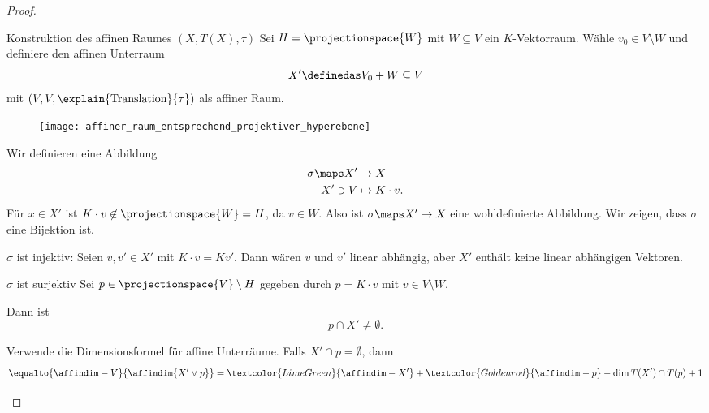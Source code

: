 \begin{proof}
  \begin{proofdescription}
    \item[Konstruktion des affinen Raumes \( (X,T(X),\tau) \)] Sei \( H=\projectionspace{W} \) mit \( W\subseteq V \) ein \( K \)-Vektorraum. Wähle \( v_0\in V\setminus W \) und definiere den affinen Unterraum
    \begin{equation*}
      X'\definedas V_0+W\subseteq V
    \end{equation*}
    mit \( (V,V,\explain{\text{Translation}}{\tau}) \) als affiner Raum.
    \begin{figure}[H]
      \centering
      \texttt{[image: affiner\_raum\_entsprechend\_projektiver\_hyperebene]}
      \label{fig:affiner_raum_entsprechend_projektiver_hyperebene}
    \end{figure}
    Wir definieren eine Abbildung
    \begin{equation*}
      \begin{split}
        \sigma\maps X'&\to X\\
      X'\ni V&\mapsto K\cdot v.
      \end{split}
    \end{equation*}
    Für \( x\in X' \) ist \( K\cdot v\not\in \projectionspace{W}=H \), da \( v\in W \). Also ist \( \sigma\maps X'\to X \) eine wohldefinierte Abbildung. Wir zeigen, dass \( \sigma \) eine Bijektion ist.
    \begin{proofdescription}
      \item[\( \sigma \) ist injektiv:] Seien \( v,v'\in X' \) mit \( K\cdot v=Kv' \). Dann wären \( v \) und \( v' \) linear abhängig, aber \( X' \) enthält keine linear abhängigen Vektoren.
      \item[\( \sigma \) ist surjektiv] Sei \( p\in \projectionspace{V}\setminus H \) gegeben durch \( p=K\cdot v \) mit \( v\in V\setminus W \). \begin{behauptung*}
        Dann ist 
        \begin{equation*}
          p\cap X'\neq \emptyset.
        \end{equation*}
      \end{behauptung*} 
      Verwende die Dimensionsformel für affine Unterräume. Falls \( X'\cap p=\emptyset \), dann
      \begin{align*}
        \equalto{\affindim-{V}}{\affindim{X'\vee p}}&=\textcolor{LimeGreen}{\affindim-{X'}}+\textcolor{Goldenrod}{\affindim-{p}}-\dim{}{T(X')\cap T(p)}+1\\

\end{align*}
\end{proofdescription}
\end{proofdescription}
\end{proof}
